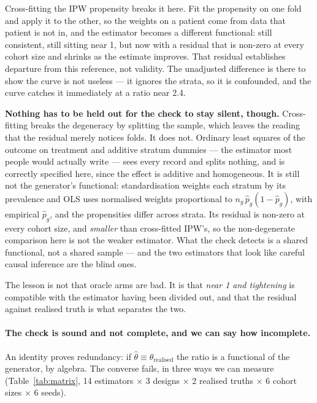 Cross-fitting the IPW propensity \citep{chernozhukov2018} breaks it here. Fit the propensity on one fold and
apply it to the
other, so the weights on a patient come from data that patient is not in, and
the estimator becomes a different functional: still consistent, still sitting
near 1, but now with a residual that is non-zero at every cohort size and shrinks
as the estimate improves. That residual establishes departure from this reference, not validity.\iffull{} The unadjusted
difference is there to show the curve is not useless --- it ignores the strata,
so it is confounded, and the curve catches it immediately at a ratio near 2.4.\fi

\iffull
\textbf{Nothing has to be held out for the check to stay silent, though.} Cross-fitting
breaks the degeneracy by splitting the sample, which leaves the reading that the
residual merely notices folds. It does not. Ordinary least squares of the
outcome on treatment and additive stratum dummies --- the estimator most people
would actually write --- sees every record and splits nothing, and is correctly
specified here, since the effect is additive and homogeneous. It is still not the
generator's functional: standardisation weights each stratum by its prevalence
and OLS uses normalised weights proportional to
$n_g\,\hat p_g(1 - \hat p_g)$, with empirical $\hat p_g$, and the propensities differ across strata. Its residual is
non-zero at every cohort size, and \emph{smaller} than cross-fitted IPW's, so
the non-degenerate comparison here is not the weaker estimator. What the check
detects is a shared functional, not a shared sample --- and the two estimators
that look like careful causal inference are the blind ones.
\fi

\iffull
The lesson is not that oracle arms are bad. It is that \emph{near 1 and
tightening} is compatible with the estimator having been divided out, and that
the residual against realised truth is what separates the two.
\fi

\iffull
\paragraph{The check is sound and not complete, and we can say how incomplete.}
An identity proves redundancy: if $\hat\theta \equiv \theta_{\text{realised}}$
the ratio is a functional of the generator, by algebra. The converse fails, in
three ways we can measure (Table~\ref{tab:matrix}, 14 estimators $\times$ 3
designs $\times$ 2 realised truths $\times$ 6 cohort sizes $\times$ 6 seeds).

